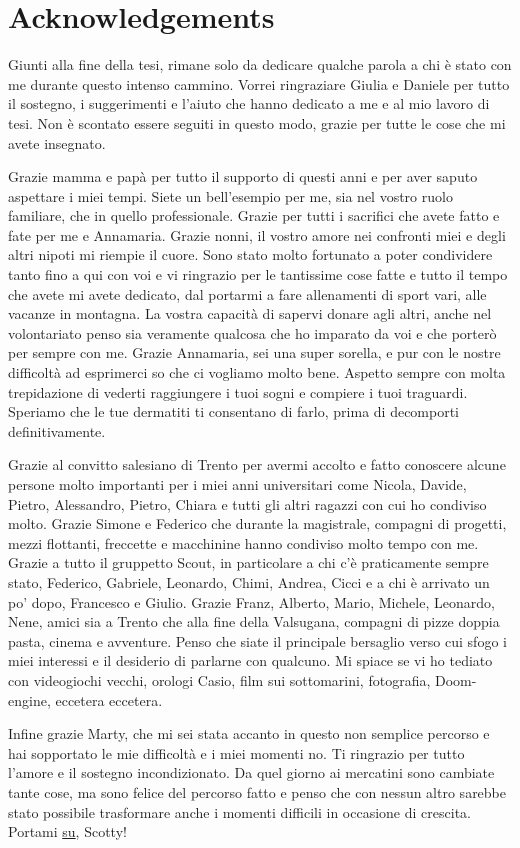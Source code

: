 \chapter*{Acknowledgements}
\thispagestyle{empty}

Giunti alla fine della tesi, rimane solo da dedicare qualche parola a chi è stato con me durante questo intenso cammino.
Vorrei ringraziare Giulia e Daniele per tutto il sostegno, i suggerimenti e l'aiuto che hanno dedicato a me e al mio lavoro di tesi. Non è scontato essere seguiti in questo modo, grazie per tutte le cose che mi avete insegnato.

Grazie mamma e papà per tutto il supporto di questi anni e per aver saputo aspettare i miei tempi. Siete un bell'esempio per me, sia nel vostro ruolo familiare, che in quello professionale. Grazie per tutti i sacrifici che avete fatto e fate per me e Annamaria. 
Grazie nonni, il vostro amore nei confronti miei e degli altri nipoti mi riempie il cuore. Sono stato molto fortunato a poter condividere tanto fino a qui con voi e vi ringrazio per le tantissime cose fatte e tutto il tempo che avete mi avete dedicato, dal portarmi a fare allenamenti di sport vari, alle vacanze in montagna. La vostra capacità di sapervi donare agli altri, anche nel volontariato penso sia veramente qualcosa che ho imparato da voi e che porterò per sempre con me.
Grazie Annamaria, sei una super sorella, e pur con le nostre difficoltà ad esprimerci so che ci vogliamo molto bene. Aspetto sempre con molta trepidazione di vederti raggiungere i tuoi sogni e compiere i tuoi traguardi. Speriamo che le tue dermatiti ti consentano di farlo, prima di decomporti definitivamente.  


Grazie al convitto salesiano di Trento per avermi accolto e fatto conoscere alcune persone molto importanti per i miei anni universitari come Nicola, Davide, Pietro, Alessandro, Pietro, Chiara e tutti gli altri ragazzi con cui ho condiviso molto. 
Grazie Simone e Federico che durante la magistrale, compagni di progetti, mezzi flottanti, freccette e macchinine hanno condiviso molto tempo con me. Grazie a tutto il gruppetto Scout, in particolare a chi c'è praticamente sempre stato, Federico, Gabriele, Leonardo, Chimi, Andrea, Cicci e a chi è arrivato un po' dopo, Francesco e Giulio. Grazie Franz, Alberto, Mario, Michele, Leonardo, Nene, amici sia a Trento che alla fine della Valsugana, compagni di pizze doppia pasta, cinema e avventure. Penso che siate il principale bersaglio verso cui sfogo i miei interessi e il desiderio di parlarne con qualcuno. Mi spiace se vi ho tediato con videogiochi vecchi, orologi Casio, film sui sottomarini, fotografia, Doom-engine, eccetera eccetera. 

Infine grazie Marty, che mi sei stata accanto in questo non semplice percorso e hai sopportato le mie difficoltà e i miei momenti no. Ti ringrazio per tutto l'amore e il sostegno incondizionato. Da quel giorno ai mercatini sono cambiate tante cose, ma sono felice del percorso fatto e penso che con nessun altro sarebbe stato possibile trasformare anche i momenti difficili in occasione di crescita.\\

Portami \hyperref[sec:inizio]{su}, Scotty!